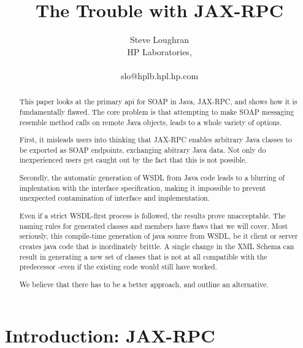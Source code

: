 \documentclass[draft]{paper}
\begin{document}

\setlength{\parskip}{3ex}

\parindent 0pt


\title{The Trouble with JAX-RPC}
\author{
    Steve Loughran\\
    HP Laboratories,\\
    \\
    slo@hplb.hpl.hp.com\\
    }
\maketitle
\begin{abstract}

This paper looks at the primary api for SOAP in Java, JAX-RPC, and
shows how it is fundamentally flawed. The core problem is that attempting
to make SOAP messaging resemble method calls on remote Java objects, leads
to a whole variety of options. 

First, it misleads users into thinking that JAX-RPC enables arbitrary Java classes
to be exported as SOAP endpoints, exchanging abitrary Java data. Not only do 
inexperienced users get caught out by the fact that this is not possible, 

Secondly, the automatic generation of WSDL from Java code leads to a blurring
of implentation with the interface specification, making it impossible to prevent
unexpected contamination of interface and implementation.

Even if a strict WSDL-first process is followed, the results prove unacceptable.
The naming rules for generated classes and members have flaws that we will cover.
Most seriously, this compile-time generation of java source from WSDL,
be it client or server creates java code that is inordinately brittle. A single change
in the XML Schema can result in generating a new set of classes that is not
at all compatible with the predecessor -even if the existing code would still have worked.

We believe that there has to be a better approach, and outline an alternative.



\end{abstract}




\section{Introduction: JAX-RPC}
\end{document}
